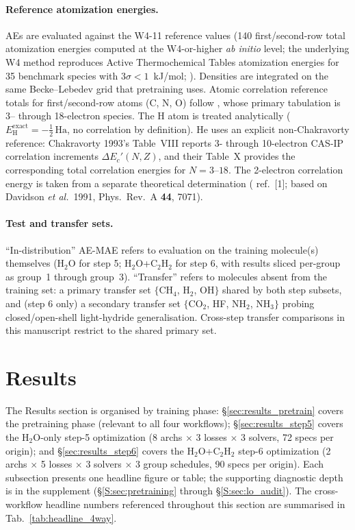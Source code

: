 \documentclass[11pt,letterpaper]{article}
\begin{document}
\paragraph{Reference atomization energies.} AEs are evaluated against the
W4-11 reference values (140 first/second-row total atomization energies
computed at the W4-or-higher \textit{ab initio} level; the underlying W4
method reproduces Active Thermochemical Tables atomization energies for
35 benchmark species with $3\sigma < 1$~kJ/mol;
\citealp{KartonDaonMartin2011}). Densities are integrated on the same
Becke--Lebedev grid that pretraining uses. Atomic correlation reference
totals for first/second-row atoms (C, N, O) follow
\citet{ChakravortyEtAl1993}, whose primary tabulation is 3-- through
18-electron species. The H atom is treated analytically
($E^{\mathrm{exact}}_{\mathrm{H}} = -\tfrac{1}{2}\,\mathrm{Ha}$, no
correlation by definition). He uses an explicit non-Chakravorty
reference: Chakravorty 1993's Table~VIII reports 3- through
10-electron CAS-IP correlation increments $\Delta E_c'(N,Z)$, and their
Table~X provides the corresponding total correlation energies for
$N=3$--$18$. The 2-electron correlation energy is taken from a
separate theoretical determination (\citealp{ChakravortyEtAl1993}
ref.~[1]; based on Davidson \emph{et al.}\ 1991, Phys.~Rev.~A
\textbf{44}, 7071).

\paragraph{Test and transfer sets.} ``In-distribution'' AE-MAE refers to
evaluation on the training molecule(s) themselves (H$_2$O for step 5;
H$_2$O+C$_2$H$_2$ for step 6, with results sliced per-group as group~1
through group~3). ``Transfer'' refers to molecules absent from the
training set: a primary transfer set $\{$CH$_4$, H$_2$, OH$\}$ shared by
both step subsets, and (step 6 only) a secondary transfer set
$\{$CO$_2$, HF, NH$_2$, NH$_3\}$ probing closed/open-shell light-hydride
generalisation. Cross-step transfer comparisons in this manuscript
restrict to the shared primary set.

\section{Results}
\label{sec:results}

The Results section is organised by training phase: \S\ref{sec:results_pretrain}
covers the pretraining phase (relevant to all four workflows);
\S\ref{sec:results_step5} covers the H$_2$O-only step-5 optimization
(8 archs $\times$ 3 losses $\times$ 3 solvers, 72 specs per origin); and
\S\ref{sec:results_step6} covers the H$_2$O+C$_2$H$_2$ step-6 optimization
(2 archs $\times$ 5 losses $\times$ 3 solvers $\times$ 3 group schedules,
90 specs per origin). Each subsection presents one headline figure or
table; the supporting diagnostic depth is in the supplement (\S\ref{S:sec:pretraining}
through \S\ref{S:sec:lo_audit}). The cross-workflow headline numbers
referenced throughout this section are summarised in
Tab.~\ref{tab:headline_4way}.
\end{document}
